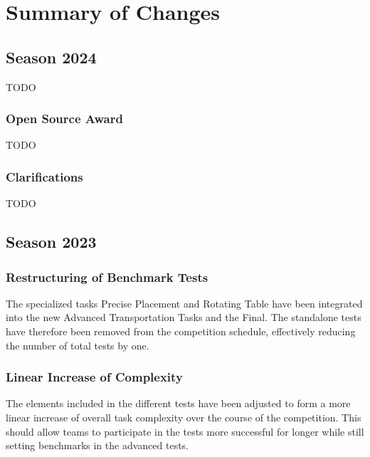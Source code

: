 
\chapter{Summary of Changes}

\begin{comment}
This chapter provides an overview for experienced teams that know the rules and just need an update on what is new for the specific year. 
All new teams are strongly advised to read the whole rule book thoroughly.
\end{comment}

\section{Season 2024}

TODO

\subsection{Open Source Award}

TODO

\subsection{Clarifications}

TODO

\section{Season 2023}

\subsection{Restructuring of Benchmark Tests}

The specialized tasks Precise Placement and Rotating Table have been integrated into the new Advanced Transportation Tasks and the Final.
The standalone tests have therefore been removed from the competition schedule, effectively reducing the number of total tests by one.

\subsection{Linear Increase of Complexity}

The elements included in the different tests have been adjusted to form a more linear increase of overall task complexity over the course of the competition. This should allow teams to participate in the tests more successful for longer while still setting benchmarks in the advanced tests.

